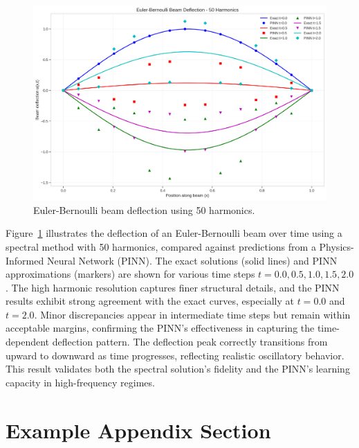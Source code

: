 \documentclass[preprint,12pt]{elsarticle}
\begin{document}
\begin{figure}[t]
    \centering
    \includegraphics[width=0.9\linewidth]{figures/euler_bernoulli_beam_50h.png}
    \caption{Euler-Bernoulli beam deflection using 50 harmonics.}
    \label{fig:beam_50h}
\end{figure}

\noindent
Figure~\ref{fig:beam_50h} illustrates the deflection of an Euler-Bernoulli beam over time using a spectral method with 50 harmonics, compared against predictions from a Physics-Informed Neural Network (PINN). The exact solutions (solid lines) and PINN approximations (markers) are shown for various time steps \( t = 0.0, 0.5, 1.0, 1.5, 2.0 \). The high harmonic resolution captures finer structural details, and the PINN results exhibit strong agreement with the exact curves, especially at \( t = 0.0 \) and \( t = 2.0 \). Minor discrepancies appear in intermediate time steps but remain within acceptable margins, confirming the PINN’s effectiveness in capturing the time-dependent deflection pattern. The deflection peak correctly transitions from upward to downward as time progresses, reflecting realistic oscillatory behavior. This result validates both the spectral solution’s fidelity and the PINN's learning capacity in high-frequency regimes.



\appendix
\section{Example Appendix Section}
\label{app1}



\end{document}
